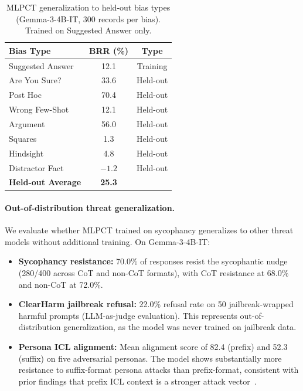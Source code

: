 \begin{table}[t]
\centering
\caption{MLPCT generalization to held-out bias types (Gemma-3-4B-IT, 300 records per bias). Trained on Suggested Answer only.}
\label{tab:mlpct_9bias}
\small
\begin{tabular}{lcc}
\toprule
\textbf{Bias Type} & \textbf{BRR (\%)}  & \textbf{Type} \\
\midrule
Suggested Answer & 12.1 & Training \\
\midrule
Are You Sure? & 33.6 & Held-out \\
Post Hoc & 70.4 & Held-out \\
Wrong Few-Shot & 12.1 & Held-out \\
Argument & 56.0 & Held-out \\
Squares & 1.3 & Held-out \\
Hindsight & 4.8 & Held-out \\
Distractor Fact & $-1.2$ & Held-out \\
\midrule
\textbf{Held-out Average} & \textbf{25.3} & \\
\bottomrule
\end{tabular}
\end{table}

\paragraph{Out-of-distribution threat generalization.} We evaluate whether MLPCT trained on sycophancy generalizes to other threat models without additional training. On Gemma-3-4B-IT:
\begin{itemize}
    \item \textbf{Sycophancy resistance:} 70.0\% of responses resist the sycophantic nudge (280/400 across CoT and non-CoT formats), with CoT resistance at 68.0\% and non-CoT at 72.0\%.
    \item \textbf{ClearHarm jailbreak refusal:} 22.0\% refusal rate on 50 jailbreak-wrapped harmful prompts (LLM-as-judge evaluation). This represents out-of-distribution generalization, as the model was never trained on jailbreak data.
    \item \textbf{Persona ICL alignment:} Mean alignment score of 82.4 (prefix) and 52.3 (suffix) on five adversarial personas. The model shows substantially more resistance to suffix-format persona attacks than prefix-format, consistent with prior findings that prefix ICL context is a stronger attack vector~\citep{irpan2025consistency}.
\end{itemize}

